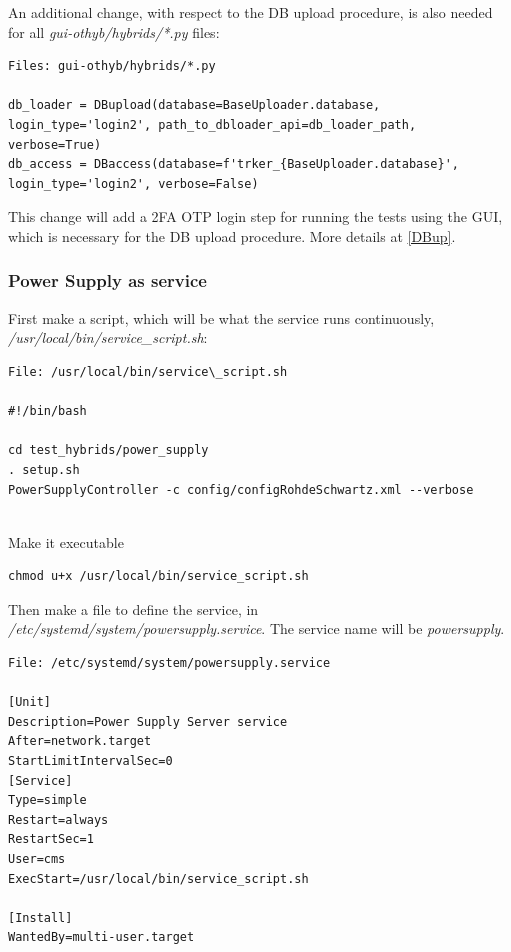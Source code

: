 \documentclass[10pt,a4paper]{article}
\begin{document}
\newpage

An additional change, with respect to the DB upload procedure, is also needed for all \emph{gui-othyb/hybrids/*.py} files: 

\begin{framed}
\begin{verbatim}
Files: gui-othyb/hybrids/*.py

db_loader = DBupload(database=BaseUploader.database,
login_type='login2', path_to_dbloader_api=db_loader_path, 
verbose=True)
db_access = DBaccess(database=f'trker_{BaseUploader.database}', 
login_type='login2', verbose=False)

\end{verbatim}
\end{framed}

This change will add a 2FA OTP login step for running the tests using the GUI, which is necessary for the DB upload procedure. More details at \ref{DBup}.

\subsubsection{Power Supply as service}
\label{ps-service}

First make a script, which will be what the service runs continuously, \emph{/usr/local/bin/service\_script.sh}:

\begin{framed}
\begin{verbatim}
File: /usr/local/bin/service\_script.sh

#!/bin/bash

cd test_hybrids/power_supply
. setup.sh
PowerSupplyController -c config/configRohdeSchwartz.xml --verbose
    
\end{verbatim}
\end{framed}

Make it executable

\begin{framed}
\begin{verbatim}
chmod u+x /usr/local/bin/service_script.sh
\end{verbatim}
\end{framed}

Then make a file to define the service, in \emph{/etc/systemd/system/powersupply.service}. The service name will be \textit{powersupply}.

\begin{framed}
\begin{verbatim}
File: /etc/systemd/system/powersupply.service

[Unit]
Description=Power Supply Server service
After=network.target
StartLimitIntervalSec=0
[Service]
Type=simple
Restart=always
RestartSec=1
User=cms
ExecStart=/usr/local/bin/service_script.sh

[Install]
WantedBy=multi-user.target

\end{verbatim}
\end{framed}
\end{document}
